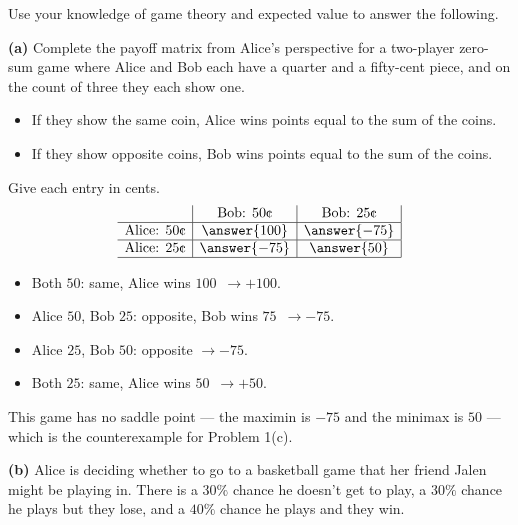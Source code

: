 \documentclass[12pt]{ximera}
\begin{document}
\begin{problem}
Use your knowledge of game theory and expected value to answer the following.

\begin{prompt}
\textbf{(a)} Complete the payoff matrix from Alice's perspective for a two-player
zero-sum game where Alice and Bob each have a quarter and a fifty-cent piece, and on the
count of three they each show one.
\begin{itemize}
\item If they show the same coin, Alice wins points equal to the sum of the coins.
\item If they show opposite coins, Bob wins points equal to the sum of the coins.
\end{itemize}

Give each entry in cents.
\[
\begin{array}{c|c|c|}
\phantom{|} & \text{Bob: }50\text{\textcent} & \text{Bob: }25\text{\textcent} \\\hline
\text{Alice: }50\text{\textcent} & \answer{100} & \answer{-75} \\\hline
\text{Alice: }25\text{\textcent} & \answer{-75} & \answer{50} \\\hline
\end{array}
\]

\begin{feedback}
\begin{itemize}
\item Both $50$\textcent: same, Alice wins $100$\textcent\ $\to +100$.
\item Alice $50$\textcent, Bob $25$\textcent: opposite, Bob wins $75$\textcent\ $\to -75$.
\item Alice $25$\textcent, Bob $50$\textcent: opposite $\to -75$.
\item Both $25$\textcent: same, Alice wins $50$\textcent\ $\to +50$.
\end{itemize}
This game has no saddle point --- the maximin is $-75$ and the minimax is $50$ --- which
is the counterexample for Problem 1(c).
\end{feedback}
\end{prompt}

\begin{prompt}
\textbf{(b)} Alice is deciding whether to go to a basketball game that her friend Jalen
might be playing in. There is a $30\%$ chance he doesn't get to play, a $30\%$ chance he
plays but they lose, and a $40\%$ chance he plays and they win.


\end{prompt}
\end{problem}
\end{document}
